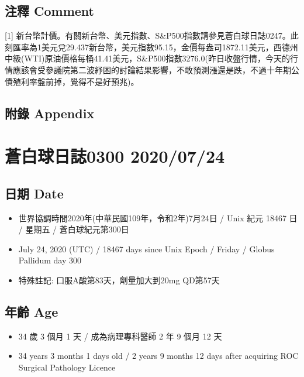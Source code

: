 \documentclass[a5paper, 11pt
]{book}
\providecommand{\tightlist}{%
  \setlength{\itemsep}{0pt}\setlength{\parskip}{0pt}}
\begin{document}
\hypertarget{ux6ce8ux91cb-comment-52}{%
\subsection{注釋 Comment}\label{ux6ce8ux91cb-comment-52}}

{[}1{]}
新台幣計價。有關新台幣、美元指數、S\&P500指數請參見蒼白球日誌0247。此刻匯率為1美元兌29.437新台幣，美元指數95.15，金價每盎司1872.11美元，西德州中級(WTI)原油價格每桶41.41美元，S\&P500指數3276.0(昨日收盤行情，今天的行情應該會受參議院第二波紓困的討論結果影響，不敢預測漲還是跌，不過十年期公債殖利率盤前掉，覺得不是好預兆)。

\hypertarget{ux9644ux9304-appendix-52}{%
\subsection{附錄 Appendix}\label{ux9644ux9304-appendix-52}}

\hypertarget{ux84bcux767dux7403ux65e5ux8a8c0300-20200724}{%
\section{蒼白球日誌0300
2020/07/24}\label{ux84bcux767dux7403ux65e5ux8a8c0300-20200724}}

\hypertarget{ux65e5ux671f-date-53}{%
\subsection{日期 Date}\label{ux65e5ux671f-date-53}}

\begin{itemize}
\tightlist
\item
  世界協調時間2020年(中華民國109年，令和2年)7月24日 / Unix 紀元 18467 日
  / 星期五 / 蒼白球紀元第300日
\item
  July 24, 2020 (UTC) / 18467 days since Unix Epoch / Friday / Globus
  Pallidum day 300
\item
  特殊註記: 口服A酸第83天，劑量加大到20mg QD第57天
\end{itemize}

\hypertarget{ux5e74ux9f61-age-53}{%
\subsection{年齡 Age}\label{ux5e74ux9f61-age-53}}

\begin{itemize}
\tightlist
\item
  34 歲 3 個月 1 天 / 成為病理專科醫師 2 年 9 個月 12 天
\item
  34 years 3 months 1 days old / 2 years 9 months 12 days after
  acquiring ROC Surgical Pathology Licence
\end{itemize}
\end{document}
